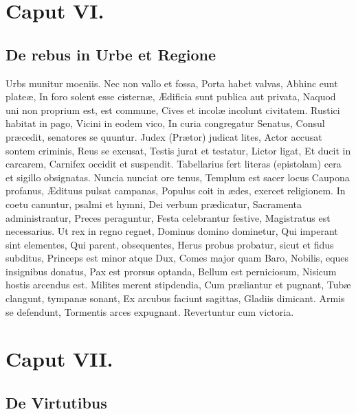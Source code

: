 \documentclass{book}
\begin{document}
\chapter{Caput VI.}

\section{De rebus in Urbe et Regione}

Urbs munitur moeniis.
Nec non vallo et fossa,
Porta habet valvas,
Abhinc eunt plateæ,
In foro solent esse cisternæ,
Ædificia sunt publica aut privata,
Naquod uni non proprium est, est commune,
Cives et incolæ incolunt civitatem.
Rustici habitat in pago,
Vicini in eodem vico,
In curia congregatur Senatus,
Consul præcedit, senatores se quuntur.
Judex (Prætor) judicat lites,
Actor accusat sontem criminis,
Reus se excusat,
Testis jurat et testatur,
Lictor ligat,
Et ducit in carcarem,
Carnifex occidit et suspendit.
Tabellarius fert literas (epistolam) cera et sigillo obsignatas.
Nuncia nunciat ore tenus,
Templum est sacer locus
Caupona profanus,
Ædituus pulsat campanas,
Populus coit in ædes, exercet religionem.
In coetu canuntur, psalmi et hymni,
Dei verbum prædicatur,
Sacramenta administrantur,
Preces peraguntur,
Festa celebrantur festive,
Magistratus est necessarius.
Ut rex in regno regnet,
Dominus domino dominetur,
Qui imperant sint elementes,
Qui parent, obsequentes,
Herus probus probatur, sicut et fidus subditus,
Princeps est minor atque Dux,
Comes major quam Baro,
Nobilis, eques insignibus donatus,
Pax est prorsus optanda,
Bellum est perniciosum,
Nisicum hostis arcendus est.
Milites merent stipdendia,
Cum præliantur et pugnant,
Tubæ clangunt, tympanæ sonant,
Ex arcubus faciunt sagittas,
Gladiis dimicant.
Armis se defendunt,
Tormentis arces expugnant.
Revertuntur cum victoria.

\chapter{Caput VII.}

\section{De Virtutibus}
\end{document}

